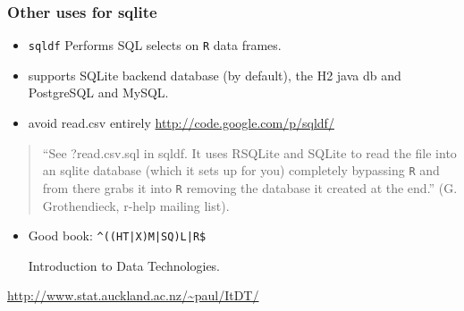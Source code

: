 \documentclass{beamer}
\newcommand{\R}{\texttt{R} }
\begin{document}
\begin{frame}[fragile]
\frametitle{Other uses for sqlite}
\label{sec-4-7}


\begin{itemize}
\item \texttt{sqldf} Performs SQL selects on \R data frames.
\item supports SQLite backend database (by default), the H2 java db and PostgreSQL and MySQL.
\item avoid read.csv entirely  \href{http://code.google.com/p/sqldf/}{http://code.google.com/p/sqldf/}
\end{itemize}

\begin{quote}
``See ?read.csv.sql in sqldf.  It uses RSQLite and SQLite to read the
file into an sqlite database (which it sets up for you) completely
bypassing \R and from there grabs it into \R removing the database it
created at the end.'' (G. Grothendieck, r-help mailing list).
\end{quote}

\begin{itemize}
\item Good book: \verb~^((HT|X)M|SQ)L|R$~

  Introduction to Data Technologies.
\end{itemize}

\url{http://www.stat.auckland.ac.nz/~paul/ItDT/}
\end{frame}
\end{document}
